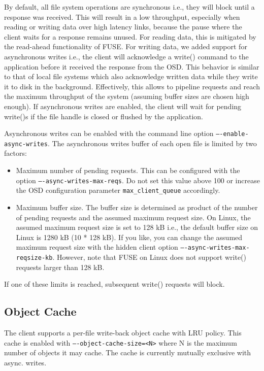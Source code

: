 \documentclass[a4paper,10pt]{book}
\begin{document}
By default, all file system operations are synchronous i.e., they will block until a response was received. This will result in a low throughput, especially when reading or writing data over high latency links, because the pause where the client waits for a response remains unused. For reading data, this is mitigated by the read-ahead functionality of FUSE. For writing data, we added support for asynchronous writes i.e., the client will acknowledge a write() command to the application before it received the response from the OSD. This behavior is similar to that of local file systems which also acknowledge written data while they write it to disk in the background. Effectively, this allows to pipeline requests and reach the maximum throughput of the system (assuming buffer sizes are chosen high enough). If asynchronous writes are enabled, the client will wait for pending write()s if the file handle is closed or flushed by the application.

Asynchronous writes can be enabled with the command line option \texttt{----enable-async-writes}. The asynchronous writes buffer of each open file is limited by two factors:
\begin{itemize}
 \item Maximum number of pending requests. This can be configured with the option \texttt{----async-writes-max-reqs}. Do not set this value above 100 or increase the OSD configuration parameter \texttt{max\_client\_queue} accordingly.
 \item Maximum buffer size. The buffer size is determined as product of the number of pending requests and the assumed maximum request size. On Linux, the assumed maximum request size is set to 128 kB i.e., the default buffer size on Linux is 1280 kB (10 * 128 kB). If you like, you can change the assumed maximum request size with the hidden client option \texttt{----async-writes-max-reqsize-kb}. However, note that FUSE on Linux does not support write() requests larger than 128 kB.
\end{itemize}
If one of these limits is reached, subsequent write() requests will block.

\subsection{Object Cache}
\label{sec:object_cache}
The client supports a per-file write-back object cache with LRU policy. This cache is enabled with \texttt{----object-cache-size=<N>} where N is the maximum number of objects it may cache. The cache is currently mutually exclusive with async. writes.
\end{document}
